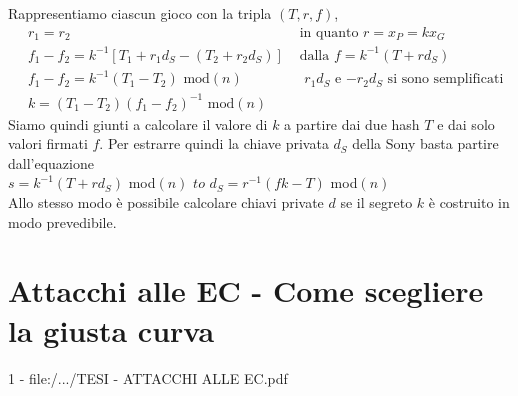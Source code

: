 \documentclass[a4paper,12pt]{tesiinfo}
\begin{document}
Rappresentiamo ciascun gioco con la tripla $(T, r, f)$,
\begin{align*}
     &r_1 = r_2 &\text{ in quanto $r = x_P = kx_G$}\\
     &f_1 - f_2 = k^{-1} [T_1+r_1d_S - (T_2 + r_2d_S)] &\text{ dalla $f = k^{-1} (T+rd_S)$}\\
     &f_1 - f_2 = k^{-1} (T_1 - T_2)  \text{ mod$(n)$} &\text{ $r_1d_S$ e $-r_2d_S$ si sono semplificati}\\
     &k= (T_1 - T_2)(f_1 - f_2)^{-1} \text{ mod$(n)$}
\end{align*}
Siamo quindi giunti a calcolare il valore di $k$ a partire dai due hash $T$ e dai solo valori firmati $f$. Per estrarre quindi la chiave privata $d_S$ della Sony basta partire dall'equazione
\\
$s = k^{-1}(T+rd_S)$ mod$(n)$ $to$ $d_S = r^{-1}(fk-T)$ mod$(n)$
\\
Allo stesso modo \`e possibile calcolare chiavi private $d$ se il segreto $k$ \`e costruito in modo prevedibile.







\chapter{Attacchi alle EC - Come scegliere la giusta curva}
1 - file:/.../TESI - ATTACCHI ALLE EC.pdf
%
%
%
%
%
%
%
%
%
%
%
%
%
%
%
%
%
%
%
%
%
%
%
%
%
%
%
%
%
%
%
%
%
%
%
%
%
%
%
%
%
\end{document}

